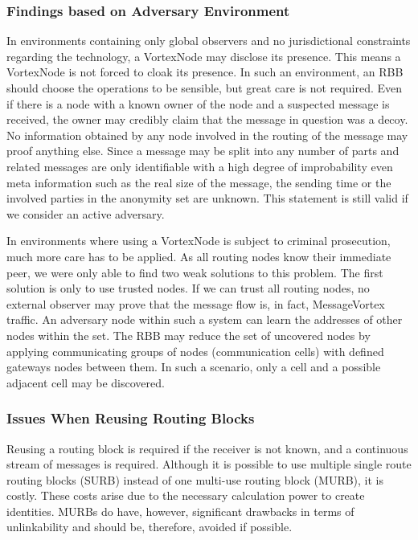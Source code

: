 \documentclass[10pt,journal,compsoc,twocolumn,twoside]{IEEEtran}
\begin{document}
\subsubsection{Findings based on Adversary Environment}
In environments containing only global observers and no jurisdictional constraints regarding the technology, a VortexNode may disclose its presence. This means a VortexNode is not forced to cloak its presence. In such an environment, an RBB should choose the operations to be sensible, but great care is not required. Even if there is a node with a known owner of the node and a suspected message is received, the owner may credibly claim that the message in question was a decoy. No information obtained by any node involved in the routing of the message may proof anything else. Since a message may be split into any number of parts and related messages are only identifiable with a high degree of improbability even meta information such as the real size of the message, the sending time or the involved parties in the anonymity set are unknown. This statement is still valid if we consider an active adversary.

In environments where using a VortexNode is subject to criminal prosecution, much more care has to be applied. As all routing nodes know their immediate peer, we were only able to find two weak solutions to this problem. The first solution is only to use trusted nodes. If we can trust all routing nodes, no external observer may prove that the message flow is, in fact, MessageVortex traffic. An adversary node within such a system can learn the addresses of other nodes within the set. The RBB may reduce the set of uncovered nodes by applying communicating groups of nodes (communication cells) with defined gateways nodes between them. In such a scenario, only a cell and a possible adjacent cell may be discovered.

\subsubsection{Issues When Reusing Routing Blocks}
Reusing a routing block is required if the receiver is not known, and a continuous stream of messages is required. Although it is possible to use multiple single route routing blocks (SURB) instead of one multi-use routing block (MURB), it is costly. These costs arise due to the necessary calculation power to create identities. MURBs do have, however, significant drawbacks in terms of unlinkability and should be, therefore, avoided if possible.
\end{document}
